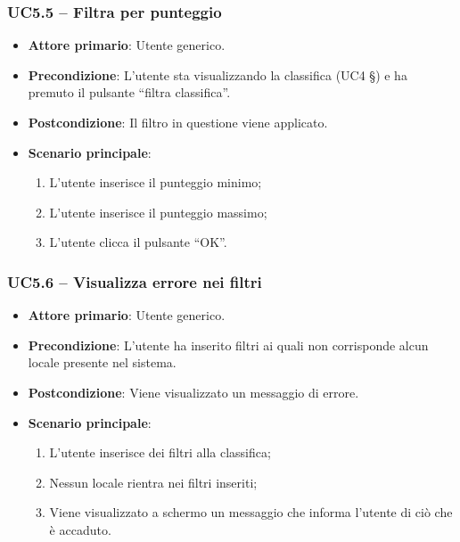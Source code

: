 \subsubsection{UC5.5 – Filtra per punteggio}
\begin{itemize}
    \item \textbf{Attore primario}: Utente generico.
    \item \textbf{Precondizione}: L’utente sta visualizzando la classifica (UC4 §) e ha premuto il pulsante “filtra classifica”.
    \item \textbf{Postcondizione}: Il filtro in questione viene applicato.
    \item \textbf{Scenario principale}: 
    \begin{enumerate}
        \item L’utente inserisce il punteggio minimo;
        \item L’utente inserisce il punteggio massimo;
        \item L’utente clicca il pulsante “OK”.
    \end{enumerate}
\end{itemize}

\subsubsection{UC5.6 – Visualizza errore nei filtri}
\begin{itemize}
    \item \textbf{Attore primario}: Utente generico.
    \item \textbf{Precondizione}: L'utente ha inserito filtri ai quali non corrisponde alcun locale presente nel sistema.
    \item \textbf{Postcondizione}: Viene visualizzato un messaggio di errore.
    \item \textbf{Scenario principale}: 
    \begin{enumerate}
        \item L'utente inserisce dei filtri alla classifica;
        \item Nessun locale rientra nei filtri inseriti;
        \item Viene visualizzato a schermo un messaggio che informa l'utente di ciò che è accaduto.
    \end{enumerate}
\end{itemize}
